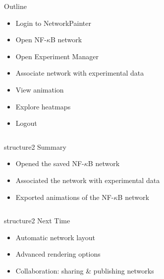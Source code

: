 \documentclass[mathserif]{beamer}
\begin{document}
\begin{frame}{Outline}
\begin{itemize}
\item Login to NetworkPainter
\item Open NF-$\kappa$B network
\item Open Experiment Manager
\item Associate network with experimental data
\item View animation
\item Explore heatmaps
\item Logout
\end{itemize}
\end{frame}

\begin{frame}
\begin{columns}
\begin{column}{3.5in}
\begin{center}
\begin{beamercolorbox}[rounded=true,shadow=true,center,sep=0.01cm]{structure2}
\LARGE
Summary
\end{beamercolorbox}
\begin{itemize}
\item Opened the saved NF-$\kappa$B network
\item Associated the network with experimental data
\item Exported animations of the NF-$\kappa$B network
\end{itemize}
\end{center}
\end{column}
\end{columns}
\end{frame}

\begin{frame}
\begin{columns}
\begin{column}{3.5in}
\begin{center}
\begin{beamercolorbox}[rounded=true,shadow=true,center,sep=0.01cm]{structure2}
\LARGE
Next Time
\end{beamercolorbox}
\begin{itemize}
\item Automatic network layout
\item Advanced rendering options
\item Collaboration: sharing \& publishing networks
\end{itemize}
\end{center}
\end{column}
\end{columns}
\end{frame}
\end{document}
